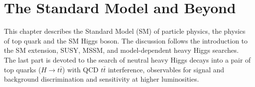 \graphicspath{{chapt_dutch/}{intro/}{sm_beyond/}{chapt3/}{chapt4/}{chapt5/}{chapt6/}{chapt7/}{chapt8/}}

\renewcommand\evenpagerightmark{{\scshape\small Chapter 2}}
\renewcommand\oddpageleftmark{{\scshape\small The Standard Model and Beyond}}
\renewcommand{\bibname}{References}

\hyphenation{}

\chapter[The Standard Model and beyond]%
{The Standard Model and Beyond}\label{chapt:2}
This chapter describes the Standard Model (SM) of particle physics, the physics of top quark and the SM Higgs boson. The discussion follows the introduction to the SM extension, SUSY, MSSM, and model-dependent heavy Higgs searches. The last part is devoted to the search of neutral heavy Higgs decays into a pair of top quarks ($H \rightarrow t\bar{t}$) with QCD $t\bar{t}$ interference, observables for signal and background discrimination and sensitivity at higher luminosities.    
